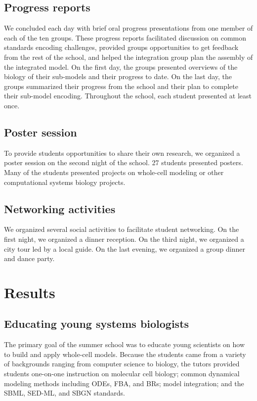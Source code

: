 \documentclass[journal,transmag]{IEEEtran}
\begin{document}
\subsection{Progress reports}
We concluded each day with brief oral progress presentations from one member of each of the ten groups. These progress reports facilitated discussion on common standards encoding challenges, provided groups opportunities to get feedback from the rest of the school, and helped the integration group plan the assembly of the integrated model. On the first day, the groups presented overviews of the biology of their sub-models and their progress to date. On the last day, the groups summarized their progress from the school and their plan to complete their sub-model encoding. 
Throughout the school, each student presented at least once.

\subsection{Poster session}
To provide students opportunities to share their own research, we organized a poster session on the second night of the school. 
27 students presented posters. Many of the students presented projects on whole-cell modeling or other computational systems biology projects.

\subsection{Networking activities}
We organized several social activities to facilitate student networking. On the first night, we organized a dinner reception. On the third night, we organized a city tour led by a local guide. On the last evening, we organized a group dinner and dance party.

\section{Results}

\subsection{Educating young systems biologists}
The primary goal of the summer school was to educate young scientists on how to build and apply whole-cell models. Because the students came from a variety of backgrounds ranging from computer science to biology, the tutors provided students one-on-one instruction on molecular cell biology; common dynamical modeling methods including ODEs, FBA, and BRs; model integration; and the SBML, SED-ML, and SBGN standards.
\end{document}
